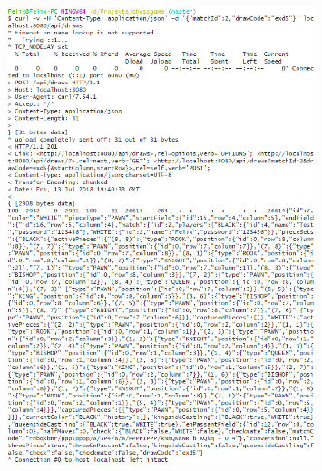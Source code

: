 \begin{enumerate}
\begin{itemize}
\begin{figure}[h]
				\includegraphics[width=0.8\textwidth]{images/question8.3.png}
			\end{figure}
		\end{itemize}
\end{enumerate}